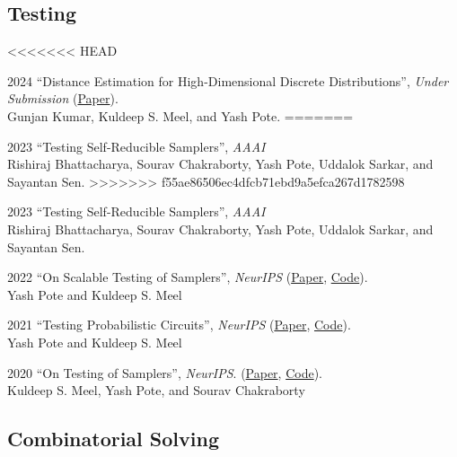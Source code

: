 \documentclass[12pt,letterpaper]{report}
\begin{document}
	
	\subsection*{Testing}
	\begin{tablist}       
<<<<<<< HEAD
		
		\item[2024] \tab  	\enquote{Distance Estimation for High-Dimensional Discrete Distributions}, \textit{Under Submission} (\href{https://arxiv.org/abs/2308.04264}{Paper}).\\
		Gunjan Kumar,  Kuldeep S. Meel, and Yash Pote.
=======
			\item[2023] \tab \enquote{Testing Self-Reducible Samplers},  \textit{AAAI}\\
		Rishiraj Bhattacharya, Sourav Chakraborty, Yash Pote, Uddalok Sarkar, and Sayantan Sen.
>>>>>>> f55ae86506ec4dfcb71ebd9a5efca267d1782598
		
		\item[2023] \tab \enquote{Testing Self-Reducible Samplers}, \textit{AAAI}\\
		Rishiraj Bhattacharya, Sourav Chakraborty, Yash Pote, Uddalok Sarkar, and Sayantan Sen.
		
		\item[2022] \tab  \enquote{On Scalable Testing of Samplers},  \textit{NeurIPS}  (\href{https://arxiv.org/abs/2306.13958}{Paper}, \href{https://github.com/meelgroup/barbarik}{Code}).\\
		Yash Pote  and Kuldeep S. Meel
		
	
		\item[2021] \tab  \enquote{Testing Probabilistic Circuits},  \textit{NeurIPS}  (\href{https://arxiv.org/abs/2112.04941}{Paper}, \href{https://github.com/meelgroup/teq}{Code}).\\
		Yash Pote  and Kuldeep S. Meel
		
		
		\item[2020] \tab  \enquote{On Testing of Samplers}, \textit{NeurIPS}. (\href{https://arxiv.org/abs/2010.12918}{Paper}, \href{https://github.com/meelgroup/barbarik}{Code}).\\
		Kuldeep S. Meel, Yash Pote, and Sourav Chakraborty
		
	\end{tablist}

	\subsection*{Combinatorial Solving}
\end{document}
